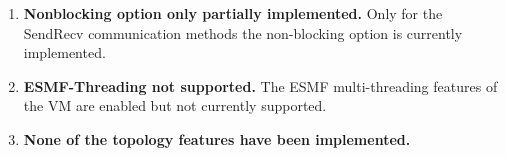 

\begin{enumerate}

\item {\bf Nonblocking option only partially implemented.} Only for the SendRecv communication methods the non-blocking option is currently implemented.

\item {\bf ESMF-Threading not supported.} The ESMF multi-threading features of the VM are enabled but not currently supported.

\item {\bf None of the topology features have been implemented.}

\end{enumerate}


